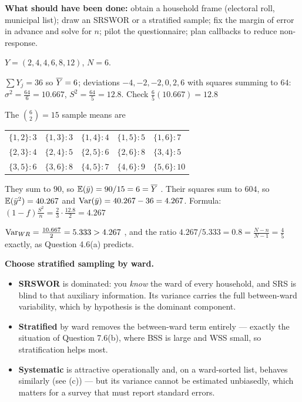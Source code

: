 \textbf{What should have been done:} obtain a household frame (electoral roll, municipal list);
draw an SRSWOR or a stratified sample; fix the margin of error in advance and solve for $n$;
pilot the questionnaire; plan callbacks to reduce non-response.

\sol $Y=(2,4,4,6,8,12)$, $N=6$.

 $\sum Y_j=36$ so $\overline{Y}=6$; deviations $-4,-2,-2,0,2,6$ with squares summing to $64$:
$\sigma^2=\frac{64}{6}=10.667$, $S^2=\frac{64}{5}=12.8$. Check
$\frac65(10.667)=12.8$ \checkmark

 The $\binom62=15$ sample means are
\begin{center}\small
\begin{tabular}{@{}lllll@{}}
\toprule
$\{1,2\}{:}3$ & $\{1,3\}{:}3$ & $\{1,4\}{:}4$ & $\{1,5\}{:}5$ & $\{1,6\}{:}7$ \\
$\{2,3\}{:}4$ & $\{2,4\}{:}5$ & $\{2,5\}{:}6$ & $\{2,6\}{:}8$ & $\{3,4\}{:}5$ \\
$\{3,5\}{:}6$ & $\{3,6\}{:}8$ & $\{4,5\}{:}7$ & $\{4,6\}{:}9$ & $\{5,6\}{:}10$ \\
\bottomrule\end{tabular}
\end{center}
They sum to $90$, so $\mathbb{E}(\bar{y})=90/15=6=\overline{Y}$ \checkmark. Their squares sum to $604$, so
$\mathbb{E}(\bar{y}^2)=40.267$ and $\operatorname{Var}(\bar{y})=40.267-36=4.267$. Formula:
$(1-f)\frac{S^2}{n}=\frac23\cdot\frac{12.8}{2}=4.267$ \checkmark

 $\operatorname{Var}_{WR}=\frac{10.667}{2}=5.333>4.267$ \checkmark, and the ratio
$4.267/5.333=0.8=\frac{N-n}{N-1}=\frac45$ exactly, as Question 4.6(a) predicts.

\sol {} \textbf{Choose stratified sampling by ward.}
\begin{itemize}
  \item \textbf{SRSWOR} is dominated: you \emph{know} the ward of every household, and SRS is
        blind to that auxiliary information. Its variance carries the full between-ward
        variability, which by hypothesis is the dominant component.
  \item \textbf{Stratified} by ward removes the between-ward term entirely --- exactly the
        situation of Question 7.6(b), where BSS is large and WSS small, so stratification helps
        most.
  \item \textbf{Systematic} is attractive operationally and, on a ward-sorted list, behaves
        similarly (see (c)) --- but its variance cannot be estimated unbiasedly, which matters for
        a survey that must report standard errors.
\end{itemize}

